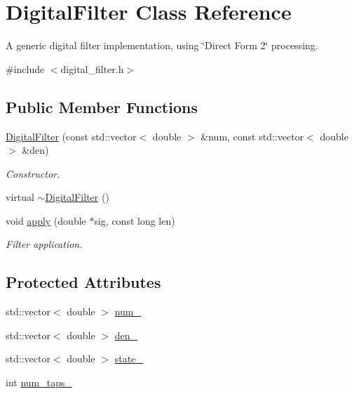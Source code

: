 \hypertarget{class_digital_filter}{}\section{Digital\+Filter Class Reference}
\label{class_digital_filter}


A generic digital filter implementation, using \char`\"{}\+Direct Form 2\char`\"{} processing.  




{\ttfamily \#include $<$digital\+\_\+filter.\+h$>$}

\subsection*{Public Member Functions}
\begin{DoxyCompactItemize}
\item 
\hyperlink{class_digital_filter_aa3d504c14a3dd71c0a8384e03fb9a3b8}{Digital\+Filter} (const std\+::vector$<$ double $>$ \&num, const std\+::vector$<$ double $>$ \&den)
\begin{DoxyCompactList}\small\item\em Constructor. \end{DoxyCompactList}\item 
virtual \hyperlink{class_digital_filter_a6d4f521ddcfaa2bfabc302cb590cc9e1}{$\sim$\+Digital\+Filter} ()
\item 
void \hyperlink{class_digital_filter_ab9e95357beb9cca85546dfa6714a0fb2}{apply} (double $\ast$sig, const long len)
\begin{DoxyCompactList}\small\item\em Filter application. \end{DoxyCompactList}\end{DoxyCompactItemize}
\subsection*{Protected Attributes}
\begin{DoxyCompactItemize}
\item 
std\+::vector$<$ double $>$ \hyperlink{class_digital_filter_abf0263de2d7837bdc002615d3d7ca365}{num\+\_\+}
\item 
std\+::vector$<$ double $>$ \hyperlink{class_digital_filter_aff805e69237ae6c450221f0d4c253bf9}{den\+\_\+}
\item 
std\+::vector$<$ double $>$ \hyperlink{class_digital_filter_a0fe7f91edef50acb1d8fb68957b71129}{state\+\_\+}
\item 
int \hyperlink{class_digital_filter_ad9099f4f1da3f23988591b9e733861d7}{num\+\_\+taps\+\_\+}
\end{DoxyCompactItemize}


